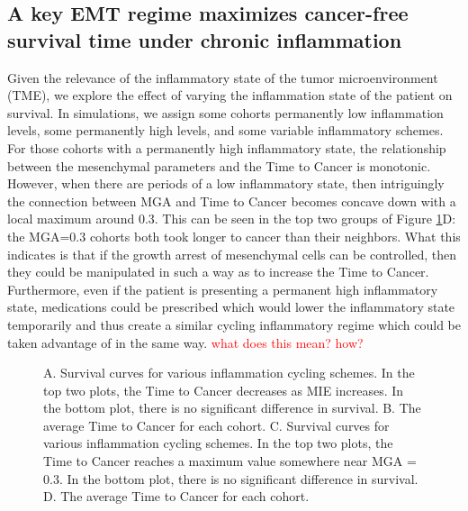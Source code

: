 \documentclass[11pt, a4paper, preprint]{article}
\newcommand{\tcr} { \textcolor{red} }
\begin{document}
\subsection{A key EMT regime maximizes cancer-free survival time under chronic inflammation}\label{KeyEMT}
Given the relevance of the inflammatory state of the tumor microenvironment (TME), we explore the effect of varying the inflammation state of the patient on survival.
In simulations, we assign some cohorts permanently low inflammation levels, some permanently high levels, and some variable inflammatory schemes.
For those cohorts with a permanently high inflammatory state, the relationship between the mesenchymal parameters and the Time to Cancer is monotonic.
However, when there are periods of a low inflammatory state, then intriguingly the connection between MGA and Time to Cancer becomes concave down with a local maximum around 0.3.
This can be seen in the top two groups of Figure \ref{fig:VaryINFL_and_MesPars}D: the MGA=0.3 cohorts both took longer to cancer than their neighbors.
What this indicates is that if the growth arrest of mesenchymal cells can be controlled, then they could be manipulated in such a way as to increase the Time to Cancer.
Furthermore, even if the patient is presenting a permanent high inflammatory state, medications could be prescribed which would lower the inflammatory state temporarily and thus create a similar cycling inflammatory regime which could be taken advantage of in the same way. \tcr{what does this mean? how?}

\begin{figure}[H]
\center
{}
\caption{A. Survival curves for various inflammation cycling schemes. In the top two plots, the Time to Cancer decreases as MIE increases. In the bottom plot, there is no significant difference in survival.
B. The average Time to Cancer for each cohort.
C. Survival curves for various inflammation cycling schemes. In the top two plots, the Time to Cancer reaches a maximum value somewhere near MGA = 0.3. In the bottom plot, there is no significant difference in survival.
D. The average Time to Cancer for each cohort.}
\label{fig:VaryINFL_and_MesPars}
\end{figure}
\end{document}
